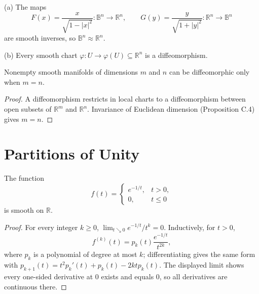 \begin{example}
\label{ex:2-14}




(a) The maps
\[
F(x)=\frac{x}{\sqrt{1-|x|^2}}:\mathbb B^n\to\mathbb R^n,
\qquad G(y)=\frac{y}{\sqrt{1+|y|^2}}:\mathbb R^n\to\mathbb B^n
\tag{2.1}
\]
are smooth inverses, so $\mathbb B^n\approx\mathbb R^n$.

(b) Every smooth chart $\varphi:U\to\varphi(U)\subseteq\mathbb R^n$ is a diffeomorphism.
\end{example}

\begin{theorem}
\label{thm:2-17}




Nonempty smooth manifolds of dimensions $m$ and $n$ can be diffeomorphic only when $m=n$.
\end{theorem}

\begin{proof}

\sketch A diffeomorphism restricts in local charts to a diffeomorphism between open subsets of $\mathbb R^m$ and $\mathbb R^n$. Invariance of Euclidean dimension (Proposition C.4) gives $m=n$.
\end{proof}

\section{Partitions of Unity}

\begin{lemma}
\label{lem:2-20}



The function
\[
f(t)=\begin{cases}e^{-1/t},&t>0,\\0,&t\leq0\end{cases}
\]
is smooth on $\mathbb R$.
\end{lemma}

\begin{proof}
\sketch For every integer $k\geq0$, $\lim_{t\searrow0}e^{-1/t}/t^k=0$. Inductively, for $t>0$,
\[
f^{(k)}(t)=p_k(t)\frac{e^{-1/t}}{t^{2k}},
\]
where $p_k$ is a polynomial of degree at most $k$; differentiating gives the same form with $p_{k+1}(t)=t^2p_k'(t)+p_k(t)-2ktp_k(t)$. The displayed limit shows every one-sided derivative at $0$ exists and equals $0$, so all derivatives are continuous there.
\end{proof}


